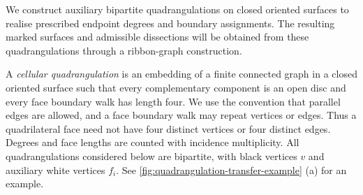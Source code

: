 \documentclass[11pt]{amsart}
\theoremstyle{definition}
\theoremstyle{plain}
\theoremstyle{definition}
\theoremstyle{definition}
\begin{document}
We construct auxiliary bipartite quadrangulations on closed oriented
surfaces to realise prescribed endpoint degrees and boundary assignments.
The resulting marked surfaces and admissible dissections will be obtained
from these quadrangulations through a ribbon-graph construction.

A \emph{cellular quadrangulation} is an embedding of a finite connected
graph in a closed oriented surface such that every complementary
component is an open disc and every face boundary walk has length four.
We use the convention that parallel edges are allowed, and
a face boundary walk may repeat vertices or edges.  Thus a quadrilateral
face need not have four distinct vertices or four distinct edges.
Degrees and face lengths are counted with incidence multiplicity.
All quadrangulations considered below are bipartite, with black vertices
$v$ and auxiliary white vertices $f_i$.  
See \cref{fig:quadrangulation-transfer-example} \textup{(a)} for an example.
\end{document}
